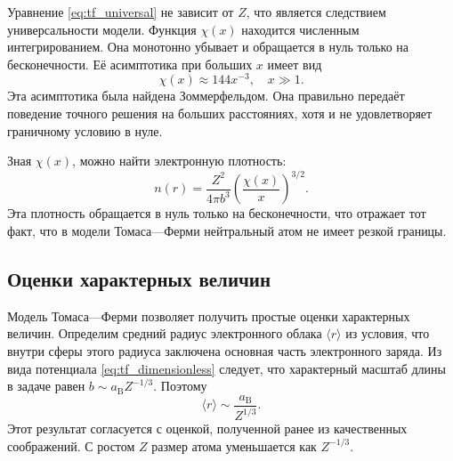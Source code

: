 \documentclass[a4paper, 12pt]{article}
\numberwithin{equation}{section}
\begin{document}
Уравнение \eqref{eq:tf_universal} не зависит от $Z$, что является следствием универсальности модели. Функция $\chi(x)$ находится численным интегрированием. Она монотонно убывает и обращается в нуль только на бесконечности. Её асимптотика при больших $x$ имеет вид
\begin{equation}
\label{eq:tf_asymptotic}
\chi(x) \approx 144 x^{-3}, \quad x \gg 1.
\end{equation}
Эта асимптотика была найдена Зоммерфельдом. Она правильно передаёт поведение точного решения на больших расстояниях, хотя и не удовлетворяет граничному условию в нуле.

Зная $\chi(x)$, можно найти электронную плотность:
\begin{equation}
\label{eq:tf_density}
n(r) = \frac{Z^2}{4 \pi b^3} \left( \frac{\chi(x)}{x} \right)^{3/2}.
\end{equation}
Эта плотность обращается в нуль только на бесконечности, что отражает тот факт, что в модели Томаса---Ферми нейтральный атом не имеет резкой границы.

\subsection{Оценки характерных величин}
\label{subsec:tf_estimates}

Модель Томаса---Ферми позволяет получить простые оценки характерных величин. Определим средний радиус электронного облака $\langle r \rangle$ из условия, что внутри сферы этого радиуса заключена основная часть электронного заряда. Из вида потенциала \eqref{eq:tf_dimensionless} следует, что характерный масштаб длины в задаче равен $b \sim a_{\text{B}} Z^{-1/3}$. Поэтому
\begin{equation}
\label{eq:tf_radius}
\langle r \rangle \sim \frac{a_{\text{B}}}{Z^{1/3}}.
\end{equation}
Этот результат согласуется с оценкой, полученной ранее из качественных соображений. С ростом $Z$ размер атома уменьшается как $Z^{-1/3}$.
\end{document}
